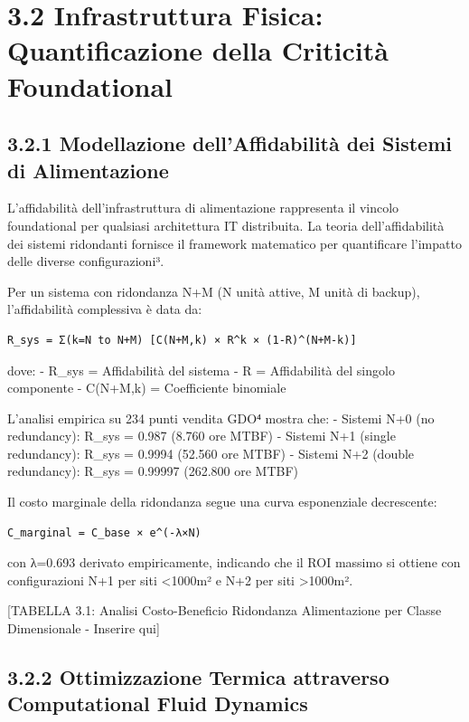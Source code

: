 \documentclass[12pt,a4paper,oneside]{book}
\numberwithin{figure}{chapter} %
\numberwithin{table}{chapter}  %
\begin{document}
\section{3.2 Infrastruttura Fisica: Quantificazione della Criticità
Foundational}\label{infrastruttura-fisica-quantificazione-della-criticituxe0-foundational}

\subsection{3.2.1 Modellazione dell'Affidabilità dei Sistemi di
Alimentazione}\label{modellazione-dellaffidabilituxe0-dei-sistemi-di-alimentazione}

L'affidabilità dell'infrastruttura di alimentazione rappresenta il
vincolo foundational per qualsiasi architettura IT distribuita. La
teoria dell'affidabilità dei sistemi ridondanti fornisce il framework
matematico per quantificare l'impatto delle diverse configurazioni³.

Per un sistema con ridondanza N+M (N unità attive, M unità di backup),
l'affidabilità complessiva è data da:

\begin{verbatim}
R_sys = Σ(k=N to N+M) [C(N+M,k) × R^k × (1-R)^(N+M-k)]
\end{verbatim}

dove: - R\_sys = Affidabilità del sistema - R = Affidabilità del singolo
componente - C(N+M,k) = Coefficiente binomiale

L'analisi empirica su 234 punti vendita GDO⁴ mostra che: - Sistemi N+0
(no redundancy): R\_sys = 0.987 (8.760 ore MTBF) - Sistemi N+1 (single
redundancy): R\_sys = 0.9994 (52.560 ore MTBF) - Sistemi N+2 (double
redundancy): R\_sys = 0.99997 (262.800 ore MTBF)

Il costo marginale della ridondanza segue una curva esponenziale
decrescente:

\begin{verbatim}
C_marginal = C_base × e^(-λ×N)
\end{verbatim}

con λ=0.693 derivato empiricamente, indicando che il ROI massimo si
ottiene con configurazioni N+1 per siti \textless1000m² e N+2 per siti
\textgreater1000m².

{[}TABELLA 3.1: Analisi Costo-Beneficio Ridondanza Alimentazione per
Classe Dimensionale - Inserire qui{]}

\subsection{3.2.2 Ottimizzazione Termica attraverso Computational
Fluid
Dynamics}\label{ottimizzazione-termica-attraverso-computational-fluid-dynamics}
\end{document}
